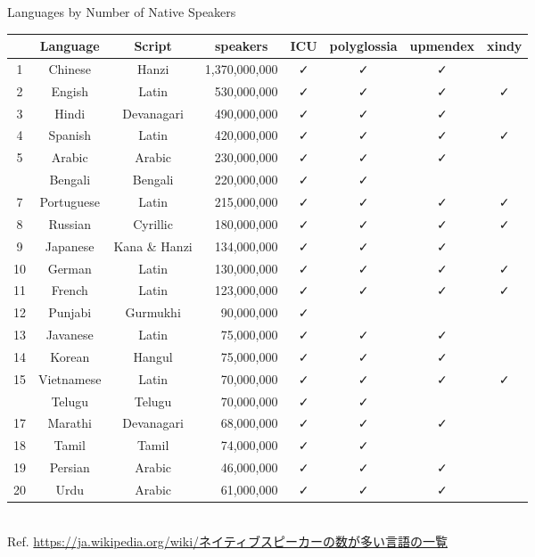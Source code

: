 \documentclass[aspectratio=169,10pt]{beamer}
\newcommand{\colRd}{\color{purple}}
\newcommand{\colGn}{\color{teal}}
\newcommand{\colBl}{\color{blue}}
\begin{document}
\begin{frame}{Languages by Number of Native Speakers}

\setlength\dashlinedash{0.5pt}
\setlength\dashlinegap{1.0pt}

\begin{center}
\scriptsize
\begin{tabular}{ccc|r|cccc}
  & Language    & Script & \multicolumn{1}{c|}{speakers} & ICU & polyglossia & upmendex & xindy \\\hline\hline
1 & Chinese     & {\colRd Hanzi     } & 1,370,000,000 & ✓ & ✓ & ✓ &    \\
2 & Engish      & Latin      &   530,000,000 & ✓ & ✓ & ✓ & ✓ \\
3 & Hindi       & {\colBl Devanagari} &   490,000,000 & ✓ & ✓ & ✓ &    \\
4 & Spanish     & Latin      &   420,000,000 & ✓ & ✓ & ✓ & ✓ \\
5 & Arabic      & {\colGn Arabic    } &   230,000,000 & ✓ & ✓ & ✓ &    \\\hdashline
6 & Bengali     & {\colBl Bengali   } &   220,000,000 & ✓ & ✓ &    &    \\
7 & Portuguese  & Latin      &   215,000,000 & ✓ & ✓ & ✓ & ✓ \\
8 & Russian     & Cyrillic   &   180,000,000 & ✓ & ✓ & ✓ & ✓ \\
9 & Japanese    & {\colRd Kana \& Hanzi } &   134,000,000 & ✓ & ✓ & ✓ &    \\
10 & German     & Latin      &   130,000,000 & ✓ & ✓ & ✓ & ✓ \\\hline
11 & French     & Latin      &   123,000,000 & ✓ & ✓ & ✓ & ✓ \\
12 & Punjabi    & {\colBl Gurmukhi  } &    90,000,000 & ✓ &    &    &    \\
13 & Javanese   & Latin      &    75,000,000 & ✓ & ✓ & ✓ &    \\
14 & Korean     & {\colRd Hangul    } &    75,000,000 & ✓ & ✓ & ✓ &    \\
15 & Vietnamese & Latin      &    70,000,000 & ✓ & ✓ & ✓ & ✓ \\\hdashline
16 & Telugu     & {\colBl Telugu    } &    70,000,000 & ✓ & ✓ &    &    \\
17 & Marathi    & {\colBl Devanagari} &    68,000,000 & ✓ & ✓ & ✓ &    \\
18 & Tamil      & {\colBl Tamil     } &    74,000,000 & ✓ & ✓ &    &    \\
19 & Persian    & {\colGn Arabic    } &    46,000,000 & ✓ & ✓ & ✓ &    \\
20 & Urdu       & {\colGn Arabic    } &    61,000,000 & ✓ & ✓ & ✓ &    \\\hline
\end{tabular}
\\
{\tiny Ref. \url{https://ja.wikipedia.org/wiki/ネイティブスピーカーの数が多い言語の一覧}}
\end{center}
\end{frame}
\end{document}
